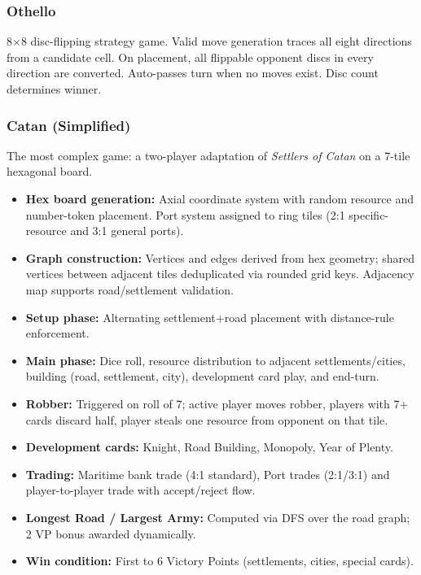 \documentclass[12pt,a4paper]{article}
\begin{document}
\subsubsection{Othello}
8$\times$8 disc-flipping strategy game. Valid move generation traces all eight directions from a candidate cell. On placement, all flippable opponent discs in every direction are converted. Auto-passes turn when no moves exist. Disc count determines winner.

\subsubsection{Catan (Simplified)}
The most complex game: a two-player adaptation of \textit{Settlers of Catan} on a 7-tile hexagonal board.

\begin{itemize}[leftmargin=2em]
  \item \textbf{Hex board generation:} Axial coordinate system with random resource and number-token placement. Port system assigned to ring tiles (2:1 specific-resource and 3:1 general ports).
  \item \textbf{Graph construction:} Vertices and edges derived from hex geometry; shared vertices between adjacent tiles deduplicated via rounded grid keys. Adjacency map supports road/settlement validation.
  \item \textbf{Setup phase:} Alternating settlement+road placement with distance-rule enforcement.
  \item \textbf{Main phase:} Dice roll, resource distribution to adjacent settlements/cities, building (road, settlement, city), development card play, and end-turn.
  \item \textbf{Robber:} Triggered on roll of 7; active player moves robber, players with 7+ cards discard half, player steals one resource from opponent on that tile.
  \item \textbf{Development cards:} Knight, Road Building, Monopoly, Year of Plenty.
  \item \textbf{Trading:} Maritime bank trade (4:1 standard), Port trades (2:1/3:1) and player-to-player trade with accept/reject flow.
  \item \textbf{Longest Road / Largest Army:} Computed via DFS over the road graph; 2 VP bonus awarded dynamically.
  \item \textbf{Win condition:} First to 6 Victory Points (settlements, cities, special cards).
\end{itemize}
\end{document}
